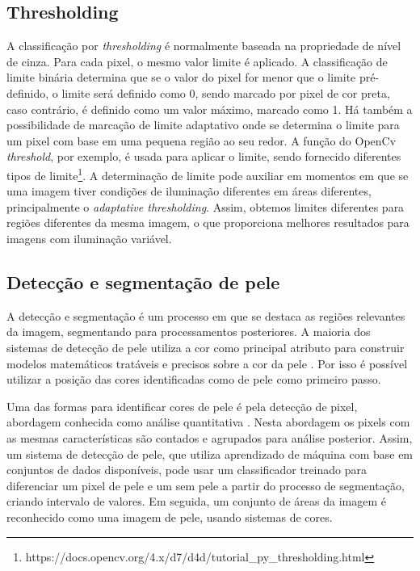 \subsection{Thresholding}
 A classificação por \textit{thresholding} é normalmente baseada na propriedade de nível de cinza. Para cada pixel, o mesmo valor limite é aplicado. A classificação de limite binária determina que se o valor do pixel for menor que o limite pré-definido, o limite será definido como 0, sendo marcado por pixel de cor preta, caso contrário, é definido como um valor máximo, marcado como 1. Há também a possibilidade de marcação de limite adaptativo onde se determina o limite para um pixel com base em uma pequena região ao seu redor. A função do OpenCv \textit{threshold}, por exemplo, é usada para aplicar o limite, sendo fornecido diferentes tipos de limite\footnote{https://docs.opencv.org/4.x/d7/d4d/tutorial\_py\_thresholding.html}. A determinação de limite pode auxiliar em momentos em que se uma imagem tiver condições de iluminação diferentes em áreas diferentes, principalmente o \textit{adaptative thresholding}. Assim, obtemos limites diferentes para regiões diferentes da mesma imagem, o que proporciona melhores resultados para imagens com iluminação variável. 

 
\subsection{Detecção e segmentação de pele}
A detecção e segmentação é um processo em que se destaca as regiões relevantes da imagem, segmentando para processamentos posteriores. A maioria dos sistemas de detecção de pele utiliza a cor como principal atributo para construir modelos matemáticos tratáveis e precisos sobre a cor da pele \cite{Deteccao_de_pele_humana_em_imagens_veiculadas_na_web}. Por isso é possível utilizar a posição das cores identificadas como de pele como primeiro passo. 

Uma das formas para identificar cores de pele é pela detecção de pixel, abordagem conhecida como análise quantitativa \cite{Deteccao_de_pele_humana_em_imagens_veiculadas_na_web}. Nesta abordagem os pixels com as mesmas características são contados e agrupados para análise posterior. Assim, um sistema de detecção de pele, que utiliza aprendizado de máquina com base em conjuntos de dados disponíveis, pode usar um classificador treinado para diferenciar um pixel de pele e um sem pele a partir do processo de segmentação, criando intervalo de valores. Em seguida, um conjunto de áreas da imagem é reconhecido como uma imagem de pele, usando sistemas de cores.

